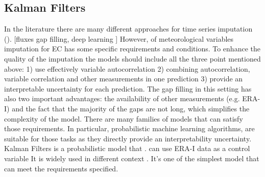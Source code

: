 \documentclass{article}
\let\Oldsubsection\subsection
\renewcommand{\subsection}{\FloatBarrier\Oldsubsection}
\begin{document}

\subsection{Kalman Filters}
In the literature there are many different approaches for time series imputation ().
[fluxes gap filling, deep learning ]
However, of meteorological variables imputation for EC has some specific requirements and conditions. To enhance the quality of the imputation  the models should include all the three point mentioned above: 1) use effectively variable autocorrelation 2) combining autocorrelation, variable correlation and other measurements in one prediction 3) provide an interpretable uncertainty for each prediction. The gap filling in this setting has also two important advantages: the availability of other measurements (e.g. ERA-I) and the fact that the majority of the gaps are not long, which simplifies the complexity of the model.
There are many families of models that can satisfy those requirements. In particular, probabilistic machine learning algorithms, are suitable for those tasks as they directly provide an interpretability uncertainty.
Kalman Filters is a probabilistic model that . can use ERA-I data as a control variable It is widely used in different context . It's one of the simplest model that can meet the requirements specified.  
\end{document}
